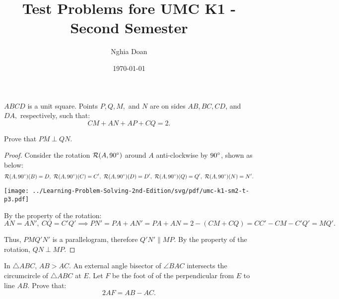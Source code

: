 \documentclass{article}
\title{Test Problems fore UMC K1 - Second Semester}
\author{Nghia Doan}
\date{\today}
\begin{document}
\maketitle

\begin{problem}
    $ABCD$ is a unit square. Points $P, Q, M,$ and $N$ are on sides $AB, BC, CD$, and $DA,$ respectively, such that:
    \[ 
        CM + AN + AP + CQ = 2.
    \]
    
    Prove that $PM \perp QN.$
\end{problem}

\begin{proof}
    Consider the rotation $\mathcal{R}(A, 90^\circ)$ around $A$ anti-clockwise by $90^\circ$, shown as below:
    \[
        \mathcal{R}(A, 90\dg)(B)= D,\ \mathcal{R}(A, 90\dg)(C)=C',\ \mathcal{R}(A, 90\dg)(D)=D',\ \mathcal{R}(A, 90\dg)(Q)=Q',\ \mathcal{R}(A, 90\dg)(N)=N'.
    \]
    \begin{center}
        \texttt{[image: ../Learning-Problem-Solving-2nd-Edition/svg/pdf/umc-k1-sm2-t-p3.pdf]}
    \end{center}

    By the property of the rotation:
    \[
        AN = AN',\ CQ = C'Q' \implies PN' = PA + AN' = PA + AN = 2 - (CM+CQ) = CC' - CM - C'Q' = MQ'.
    \]
    
    Thus, $PMQ'N'$ is a parallelogram, therefore $Q'N' \parallel MP.$ By the property of the rotation, $QN \perp MP.$
\end{proof}

\newpage

\begin{problem}
    In $\triangle ABC$, $AB > AC.$ An external angle bisector of $\angle BAC$ intersects the circumcircle of $\triangle ABC$ at $E$.
    Let $F$ be the foot of of the perpendicular from $E$ to line $AB$. Prove that:
    \[
        2AF = AB - AC.
    \]
\end{problem}
\end{document}
